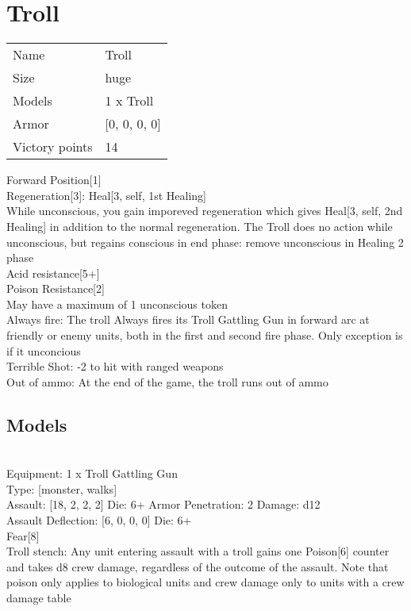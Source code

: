 \pagebreak

\section{ Troll }

\begin{tabular}{ll}
  Name & Troll \\
  Size & huge\\
  Models & 1 x Troll\\
  Armor & [0, 0, 0, 0]\\
  Victory points & 14\\
\end{tabular}

Forward Position[1]\\ 
Regeneration[3]: Heal[3, self, 1st Healing]\\ 
While unconscious, you gain imporeved regeneration which gives Heal[3, self, 2nd Healing] in addition to the normal regeneration. The Troll does no action while unconscious, but regains conscious in end phase: remove unconscious in Healing 2 phase\\ 
Acid resistance[5+]\\ 
Poison Resistance[2]\\ 
May have a maximum of 1 unconscious token\\ 
Always fire: The troll Always fires its Troll Gattling Gun in forward arc at friendly or enemy units, both in the first and second fire phase. Only exception is if it unconcious\\ 
Terrible Shot: -2 to hit with ranged weapons\\ 
Out of ammo: At the end of the game, the troll runs out of ammo\\ 


\subsection{ Models }

 \\
Equipment: 1 x Troll Gattling Gun \\
Type: [monster, walks] \\

Assault: [18, 2, 2, 2] Die: 6+ Armor Penetration: 2 Damage: d12 \\
Assault Deflection: [6, 0, 0, 0] Die: 6+\\
\indent Fear[8]\\ 
Troll stench: Any unit entering assault with a troll gains one Poison[6] counter and takes d8 crew damage, regardless of the outcome of the assault. Note that poison only applies to biological units and crew damage only to units with a crew damage table\\ 
 



